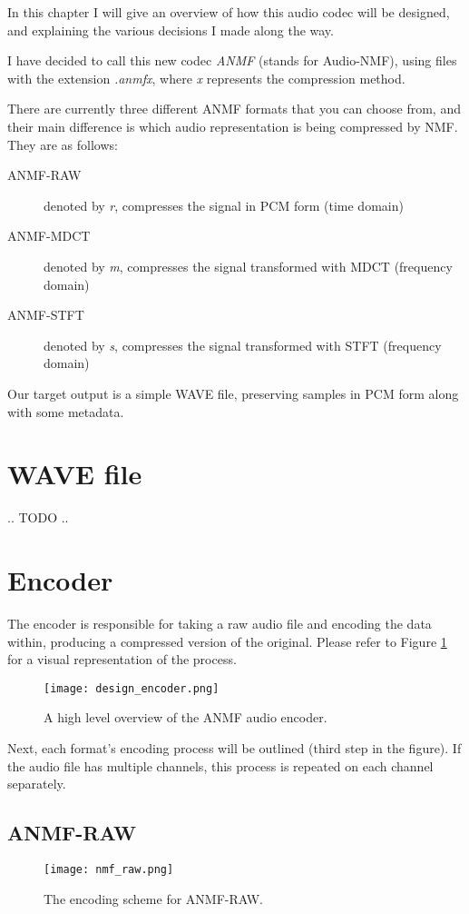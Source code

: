 In this chapter I will give an overview of how this audio codec will be designed, and explaining the various decisions I made along the way.

I have decided to call this new codec \emph{ANMF} (stands for Audio-NMF), using files with the extension \emph{.anmfx}, where \emph{x} represents the compression method.

There are currently three different ANMF formats that you can choose from, and their main difference is which audio representation is being compressed by NMF. They are as follows:

\begin{description}
	\item[ANMF-RAW] denoted by \emph{r}, compresses the signal in PCM form (time domain)
	\item[ANMF-MDCT] denoted by \emph{m}, compresses the signal transformed with MDCT (frequency domain)
	\item[ANMF-STFT] denoted by \emph{s}, compresses the signal transformed with STFT (frequency domain)
\end{description}

Our target output is a simple WAVE file, preserving samples in PCM form along with some metadata.

\section{WAVE file}
.. TODO ..

\section{Encoder}
The encoder is responsible for taking a raw audio file and encoding the data within, producing a compressed version of the original. Please refer to Figure \ref{fig:design_encoder} for a visual representation of the process.

\begin{figure}[ht]
	\label{fig:design_encoder}
	\caption[Encoder overview]{A high level overview of the ANMF audio encoder.}
	\centering
	\texttt{[image: design\_encoder.png]}
\end{figure}

Next, each format's encoding process will be outlined (third step in the figure). If the audio file has multiple channels, this process is repeated on each channel separately.

\subsection{ANMF-RAW}
\begin{figure}[ht]
	\label{fig:encoding_nmf_raw}
	\caption[ANMF-RAW Encoder]{The encoding scheme for ANMF-RAW.}
	\centering
	\texttt{[image: nmf\_raw.png]}
\end{figure}

